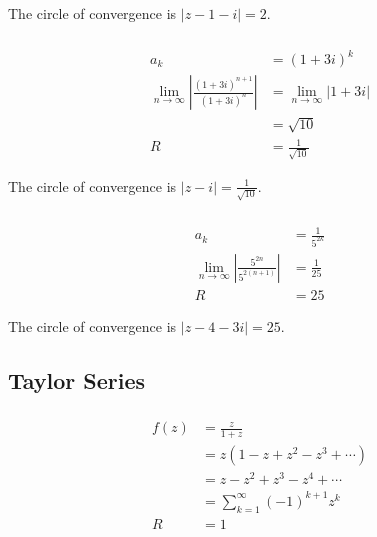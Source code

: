 \documentclass{article}
\begin{document}
The circle of convergence is $|z - 1 - i| = 2$.

\setcounter{subsubsection}{24}
\subsubsection{}

\begin{align*}
  a_k                                                                              & = (1 + 3 i)^k                           \\
  \lim_{n \rightarrow \infty} \left| \frac{(1 + 3 i)^{n + 1}}{(1 + 3 i)^n} \right| & = \lim_{n \rightarrow \infty} |1 + 3 i| \\
                                                                                   & = \sqrt{10}                             \\
  R                                                                                & = \frac{1}{\sqrt{10}}
\end{align*}

The circle of convergence is $|z - i| = \frac{1}{\sqrt{10}}$.

\setcounter{subsubsection}{26}
\subsubsection{}

\begin{align*}
  a_k                                                                      & = \frac{1}{5^{2 k}} \\
  \lim_{n \rightarrow \infty} \left| \frac{5^{2 n}}{5^{2 (n + 1)}} \right| & = \frac{1}{25}      \\
  R                                                                        & = 25
\end{align*}

The circle of convergence is $|z - 4 - 3 i| = 25$.

\subsection{Taylor Series}

\subsubsection{}

\begin{align*}
  f(z) & = \frac{z}{1 + z}                      \\
       & = z (1 - z + z^2 - z^3 + \cdots)       \\
       & = z - z^2 + z^3 - z^4 + \cdots         \\
       & = \sum_{k = 1}^\infty (-1)^{k + 1} z^k \\
  R    & = 1
\end{align*}
\end{document}
